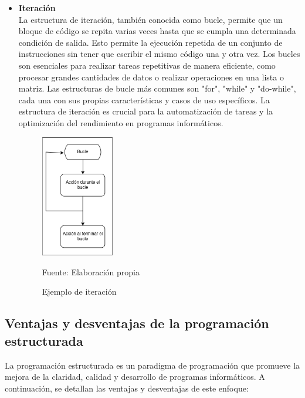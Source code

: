 \begin{itemize}
  \item \textbf{Iteración} \\
  La estructura de iteración, también conocida como bucle, permite que un bloque de código se repita varias veces hasta que se cumpla una determinada condición de salida. Esto permite la ejecución repetida de un conjunto de instrucciones sin tener que escribir el mismo código una y otra vez. Los bucles son esenciales para realizar tareas repetitivas de manera eficiente, como procesar grandes cantidades de datos o realizar operaciones en una lista o matriz. Las estructuras de bucle más comunes son "for", "while" y "do-while", cada una con sus propias características y casos de uso específicos. La estructura de iteración es crucial para la automatización de tareas y la optimización del rendimiento en programas informáticos.
  \begin{figure}[!h]
    \centering
    \includegraphics[width=0.3\textwidth]{images/iteracion.png}
    \caption{Ejemplo de iteración}
    \centering Fuente: Elaboración propia
    \label{fig:iteracion}
  \end{figure}
  \newline
\end{itemize}

\subsection{Ventajas y desventajas de la programación estructurada}
La programación estructurada es un paradigma de programación que promueve la mejora de la claridad, calidad y desarrollo de programas informáticos. A continuación, se detallan las ventajas y desventajas de este enfoque:

